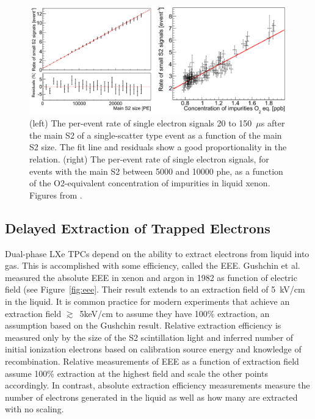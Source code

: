 \begin{figure}[htbp]
\begin{center}
\includegraphics[width=\textwidth]{figures/etrains/electron_rates.png}
\caption{(left) The per-event rate of single electron signals 20 to 150~$\mu$s after the main S2 of a single-scatter type event as a function of the main S2 size. The fit line and residuals show a good proportionality in the relation. (right) The per-event rate of single electron signals, for events with the main S2 between 5000 and 10000 phe, as a function of the O2-equivalent concentration of impurities in liquid xenon. Figures from \cite{Aprile2014}.}
\label{fig:electron_rates}
\end{center}
\end{figure}


\subsection{Delayed Extraction of Trapped Electrons} 
Dual-phase \ac{LXe} \ac{TPC}s depend on the ability to extract electrons from liquid into gas. This is accomplished with some efficiency, called the \ac{EEE}. Gushchin et al. measured the absolute \ac{EEE} in xenon and argon in 1982 as function of electric field  \cite{Gushchin1982} (see Figure~\ref{fig:eee}. Their result extends to an extraction field of 5~kV/cm in the liquid. It is common practice for modern experiments that achieve an extraction field $\gtrsim$~5keV/cm to assume they have 100\% extraction, an assumption based on the Gushchin result. Relative extraction efficiency is measured only by the size of the S2 scintillation light and inferred number of initial ionization electrons based on calibration source energy and knowledge of recombination. Relative measurements of \ac{EEE} as a function of extraction field assume 100\% extraction at the highest field and scale the other points accordingly. In contrast, absolute extraction efficiency measurements measure the number of electrons generated in the liquid as well as how many are extracted with no scaling. 

